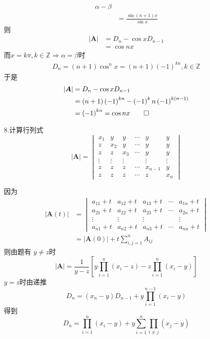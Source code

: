 \begin{Proof}
\begin{align*}
{        }{
            \alpha-\beta
        }\\
        &=\frac{
            \sin\left(n+1\right)x
        }{\sin x}
    \end{align*}则\begin{align*}
        \left|\bm{A}\right|&=D_n-\cos xD_{n-1}\\
        &=\cos nx
    \end{align*}而$x=k\pi,k\in\mathbb{Z}\Longrightarrow\alpha=\beta$时\begin{align*}
        D_n=\left(n+1\right)\cos^{n}x=\left(n+1\right)\left(-1\right)^{kn},k\in\mathbb{Z}
    \end{align*}于是\begin{align*}
        \left|\bm{A}\right|&=D_n-\cos xD_{n-1}\\
        &=\left(n+1\right)\left(-1\right)^{kn}-\left(-1\right)^kn\left(-1\right)^{k\left(n-1\right)}\\
        &=\left(-1\right)^{kn}=\cos nx\qedhere
    \end{align*}
\end{Proof}
8.计算行列式\[
\left|\bm{A}\right|=\begin{vmatrix}
    x_1&y&y&\cdots&y&y\\
    z&x_2&y&\cdots&y&y\\
    z&z&x_3&\cdots&y&y\\
    \vdots&\vdots&\vdots&&\vdots&\vdots\\
    z&z&z&\cdots&x_{n-1}&y\\
    z&z&z&\cdots&z&x_n
\end{vmatrix}
\]\begin{solution}
    因为\begin{align*}
        \left|\bm{A}\left(t\right)\right|&=\begin{vmatrix}
            a_{11}+t&a_{12}+t&a_{13}+t&\cdots&a_{1n}+t\\
            a_{21}+t&a_{22}+t&a_{23}+t&\cdots&a_{2n}+t\\
            \vdots&\vdots&\vdots&&\vdots\\
            a_{n1}+t&a_{n2}+t&a_{n3}+t&\cdots&a_{nn}+t
        \end{vmatrix}\\
        &=\left|\bm{A}\left(0\right)\right|+t\sum_{i, j=1}^{n}A_{ij}
    \end{align*}则由题有 $y\neq z$时\[
    \left|\bm{A}\right|=\frac{1}{y-z}\left[
        y\prod_{i=1}^{n}\left(x_i-z\right)-z\prod_{i=1}^{n}\left(x_i-y\right)
    \right]
    \]$y=z$时由递推\[
    D_n=\left(x_n-y\right)D_{n-1}+y\prod_{i=1}^{n-1}\left(x_i-y\right)
    \]得到\[
    D_n=\prod_{i=1}^{n}\left(x_i-y\right)+y\sum_{i=1}^{n}\prod_{i\neq j}\left(x_j-y\right)
    \]
\end{solution}